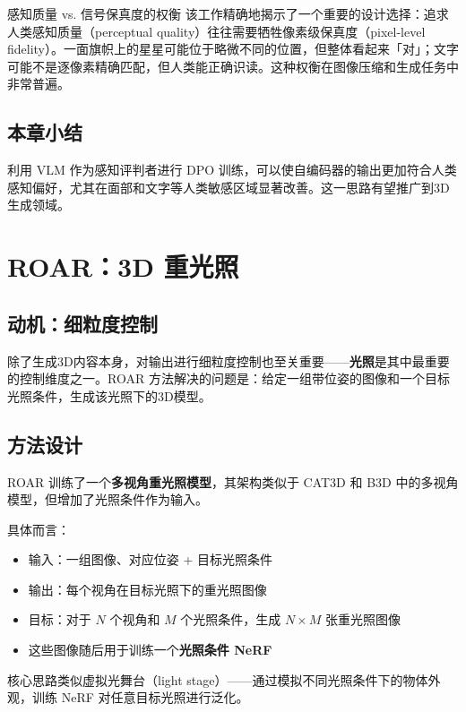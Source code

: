 \documentclass[a4paper]{article}
\begin{document}
\begin{knowledgebox}{感知质量 vs. 信号保真度的权衡}
该工作精确地揭示了一个重要的设计选择：追求人类感知质量（perceptual quality）往往需要牺牲像素级保真度（pixel-level fidelity）。一面旗帜上的星星可能位于略微不同的位置，但整体看起来「对」；文字可能不是逐像素精确匹配，但人类能正确识读。这种权衡在图像压缩和生成任务中非常普遍。
\end{knowledgebox}

\subsection{本章小结}

利用 VLM 作为感知评判者进行 DPO 训练，可以使自编码器的输出更加符合人类感知偏好，尤其在面部和文字等人类敏感区域显著改善。这一思路有望推广到3D生成领域。

\section{ROAR：3D 重光照}

\subsection{动机：细粒度控制}

除了生成3D内容本身，对输出进行细粒度控制也至关重要——\textbf{光照}是其中最重要的控制维度之一。ROAR 方法解决的问题是：给定一组带位姿的图像和一个目标光照条件，生成该光照下的3D模型。

\subsection{方法设计}

ROAR 训练了一个\textbf{多视角重光照模型}，其架构类似于 CAT3D 和 B3D 中的多视角模型，但增加了光照条件作为输入。

具体而言：
\begin{itemize}
    \item 输入：一组图像、对应位姿 + 目标光照条件
    \item 输出：每个视角在目标光照下的重光照图像
    \item 目标：对于 $N$ 个视角和 $M$ 个光照条件，生成 $N \times M$ 张重光照图像
    \item 这些图像随后用于训练一个\textbf{光照条件 NeRF}
\end{itemize}

核心思路类似虚拟光舞台（light stage）——通过模拟不同光照条件下的物体外观，训练 NeRF 对任意目标光照进行泛化。
\end{document}
